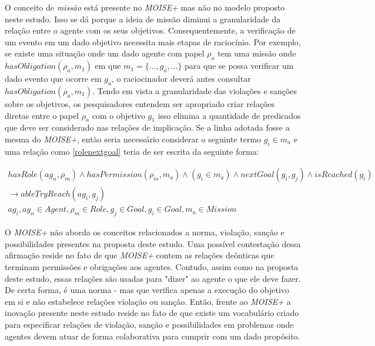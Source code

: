 O conceito de \textit{missão} está presente no \textit{MOISE+} mas não no modelo proposto neste estudo. Isso se dá porque a ideia de missão diminui 
a granularidade da relação entre o agente com os seus objetivos. Consequentemente, a verificação de um evento em um dado objetivo necessita mais etapas 
de raciocínio. Por exemplo, se existe uma situação onde um dado agente com papel $\rho_a$ tem uma missão onde $ hasObligation(\rho_a,m_1) $ em que 
$ m_1 = \{ ... , g_a, ...\}$ para que se possa verificar um dado evento que ocorre em $ g_a $, o raciocinador deverá antes consultar $ hasObligation(\rho_a,m
_1) $. Tendo em vista a granularidade das violações e sanções sobre os objetivos, os pesquisadores entendem ser apropriado criar relações diretas 
entre o papel $ \rho_a $ com o objetivo $g_1 $ isso elimina a quantidade de predicados que deve ser considerado nas relações de implicação. Se a linha 
adotada fosse a mesma do \textit{MOISE+}, então seria necessário considerar o seguinte termo $ g_i \in m_a $ e uma relação como \ref{rolenextgoal} 
teria de ser escrita da seguinte forma: 

\begin{eqnarray}\label{constmoise01}
	hasRole(ag_n,\rho_m) \wedge hasPermission(\rho_m,m_a) \wedge (g_i \in m_a) \wedge nextGoal(g_i,g_j) \wedge isReached(g_i) \nonumber \\
	\to ableTryReach(ag_i,g_j) \nonumber \\
    ag_i, ag_n \in Agent, \rho_m \in Role, g_j \in Goal, g_i \in Goal, m_a \in Mission
\end{eqnarray}

O \textit{MOISE+} não aborda os conceitos relacionados a norma, violação, sanção e possibilidades presentes na proposta deste estudo. Uma possível 
contestação dessa afirmação reside no fato de que \textit{MOISE+} contem as relações deônticas que terminam permissões e obrigações aos agentes. Contudo,  
assim como na proposta deste estudo, essas relações são usadas para "dizer" ao agente o que ele deve fazer. De certa forma, é uma norma - mas que 
verifica apenas a execução do objetivo em si e não estabelece relações violação ou sanção. Então, frente ao \textit{MOISE+} a inovação presente 
neste estudo reside no fato de que existe um vocabulário criado para especificar relações de violação, sanção e possibilidades em problemas 
onde agentes devem atuar de forma colaborativa para cumprir com um dado propósito. 
